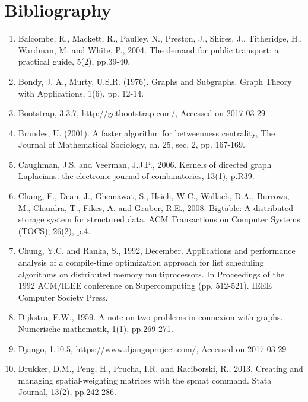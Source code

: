 \documentclass[12pt]{article}   	%
\begin{document}
\section{Bibliography}
\begin{enumerate}

\item
Balcombe, R., Mackett, R., Paulley, N., Preston, J., Shires, J., Titheridge, H., Wardman, M. and White, P., 2004. The demand for public transport: a practical guide, 5(2), pp.39-40.

\item
Bondy, J. A., Murty, U.S.R. (1976). Graphs and Subgraphs. Graph Theory with Applications, 1(6), pp. 12-14.

\item
Bootstrap, 3.3.7, http://getbootstrap.com/, Accessed on 2017-03-29

\item
Brandes, U. (2001). A faster algorithm for betweenness centrality, The Journal of Mathematical Sociology, ch. 25, sec. 2, pp. 167-169.

\item
Caughman, J.S. and Veerman, J.J.P., 2006. Kernels of directed graph Laplacians. the electronic journal of combinatorics, 13(1), p.R39.

\item
Chang, F., Dean, J., Ghemawat, S., Hsieh, W.C., Wallach, D.A., Burrows, M., Chandra, T., Fikes, A. and Gruber, R.E., 2008. Bigtable: A distributed storage system for structured data. ACM Transactions on Computer Systems (TOCS), 26(2), p.4.

\item
Chung, Y.C. and Ranka, S., 1992, December. Applications and performance analysis of a compile-time optimization approach for list scheduling algorithms on distributed memory multiprocessors. In Proceedings of the 1992 ACM/IEEE conference on Supercomputing (pp. 512-521). IEEE Computer Society Press.

\item
Dijkstra, E.W., 1959. A note on two problems in connexion with graphs. Numerische mathematik, 1(1), pp.269-271.

\item
Django, 1.10.5, https://www.djangoproject.com/, Accessed on 2017-03-29

\item
Drukker, D.M., Peng, H., Prucha, I.R. and Raciborski, R., 2013. Creating and managing spatial-weighting matrices with the spmat command. Stata Journal, 13(2), pp.242-286.


\end{enumerate}
\end{document}
